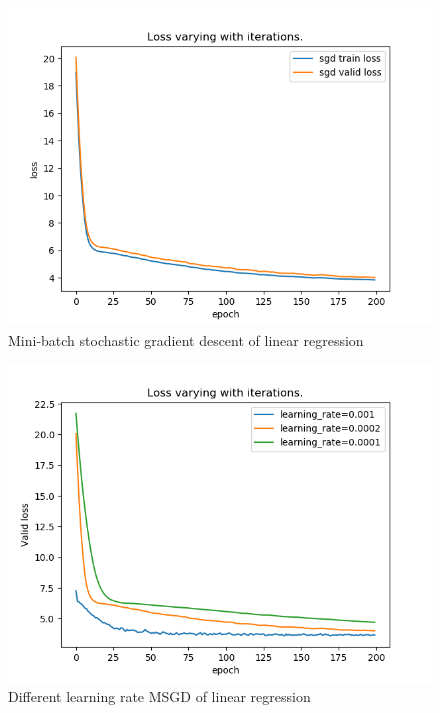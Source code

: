 \documentclass[journal, a4paper]{IEEEtran}
\begin{document}
\begin{figure}[!htb]
	\begin{center}
	\includegraphics[width=\columnwidth]{lr_sgd}
	\caption{Mini-batch stochastic gradient descent of linear regression}
	\label{fig:lr_sgd}
	\end{center}
\end{figure}
\begin{figure}[!htb]
	\begin{center}
	\includegraphics[width=\columnwidth]{lr_sgd_lr}
	\caption{Different learning rate MSGD of linear regression}
	\label{fig:lr_sgd_lr}
	\end{center}
\end{figure}
\end{document}
